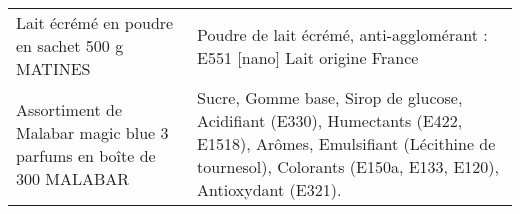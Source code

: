 \begin{longtable}{p{5cm}p{10cm}}
                                                            Lait écrémé en poudre en sachet 500 g MATINES &                                                                                                                                                                                                                                                                                                                                                                                                                                                                                                                                                                                                                                                                                                                                                                                                                                                                                                                                                               Poudre de lait écrémé, anti-agglomérant : E551 [nano]  Lait origine France \\
                                      Assortiment de Malabar magic blue 3 parfums en boîte de 300 MALABAR &                                                                                                                                                                                                                                                                                                                                                                                                                                                                                                                                                                                                                                                                                                                                                                                                                                                       Sucre, Gomme base, Sirop de glucose, Acidifiant (E330), Humectants (E422, E1518), Arômes, Emulsifiant (Lécithine de tournesol), Colorants (E150a, E133, E120), Antioxydant (E321). \\

\end{longtable}

